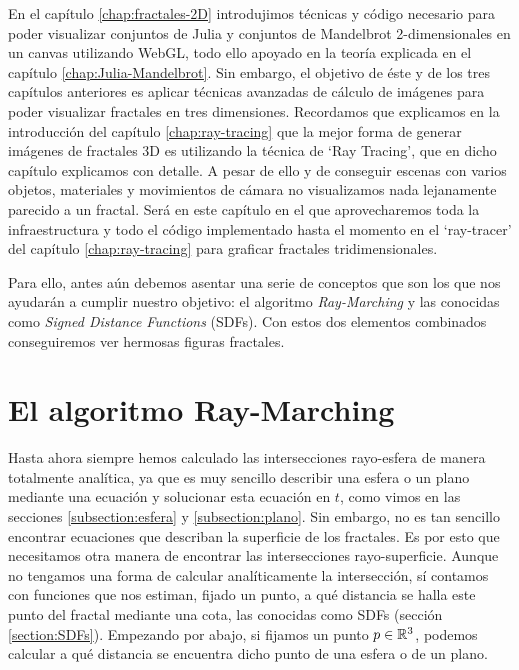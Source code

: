 %
%

En el capítulo \ref{chap:fractales-2D} introdujimos técnicas y código necesario para poder visualizar conjuntos de Julia y conjuntos de Mandelbrot 2-dimensionales en un canvas utilizando WebGL, todo ello apoyado en la teoría explicada en el capítulo \ref{chap:Julia-Mandelbrot}. Sin embargo, el objetivo de éste y de los tres capítulos anteriores es aplicar técnicas avanzadas de cálculo de imágenes para poder visualizar fractales en tres dimensiones. Recordamos que explicamos en la introducción del capítulo \ref{chap:ray-tracing} que la mejor forma de generar imágenes de fractales 3D es utilizando la técnica de `Ray Tracing', que en dicho capítulo explicamos con detalle. A pesar de ello y de conseguir escenas con varios objetos, materiales y movimientos de cámara no visualizamos nada lejanamente parecido a un fractal. Será en este capítulo en el que aprovecharemos toda la infraestructura y todo el código implementado hasta el momento en el `ray-tracer' del capítulo \ref{chap:ray-tracing} para graficar fractales tridimensionales.

Para ello, antes aún debemos asentar una serie de conceptos que son los que nos ayudarán a cumplir nuestro objetivo: el algoritmo \textit{Ray-Marching} y las conocidas como \textit{Signed Distance Functions} (SDFs). Con estos dos elementos combinados conseguiremos ver hermosas figuras fractales.

\section{El algoritmo Ray-Marching}
\label{section:ray-arching}

Hasta ahora siempre hemos calculado las intersecciones rayo-esfera de manera totalmente analítica, ya que es muy sencillo describir una esfera o un plano mediante una ecuación y solucionar esta ecuación en $t$, como vimos en las secciones \ref{subsection:esfera} y \ref{subsection:plano}. Sin embargo, no es tan sencillo encontrar ecuaciones que describan la superficie de los fractales. Es por esto que necesitamos otra manera de encontrar las intersecciones rayo-superficie. Aunque no tengamos una forma de calcular analíticamente la intersección, sí contamos con funciones que nos estiman, fijado un punto, a qué distancia se halla este punto del fractal mediante una cota, las conocidas como SDFs (sección \ref{section:SDFs}). Empezando por abajo, si fijamos un punto $p\in\mathbb{R}^3$, podemos calcular a qué distancia se encuentra dicho punto de una esfera o de un plano. 

